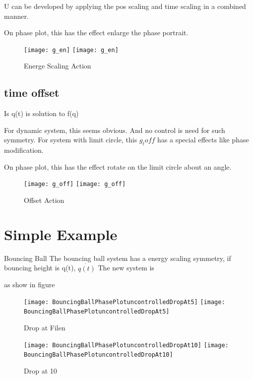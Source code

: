 U can be developed by applying the pos scaling and time scaling in a combined manner.

On phase plot, this has the effect enlarge the phase portrait.

\begin{figure}[!htbp]
  \begin{center}
    \leavevmode
    \ifpdf
      \texttt{[image: g\_en]}
    \else
      \texttt{[image: g\_en]}
    \fi
    \caption{Energe Scaling Action}
    \label{fig:gen}
\end{center}
\end{figure}
\subsection*{time offset}
Is q(t) is solution to f(q)

For dynamic system, this seems obvious. And no control is need for such symmetry.
For system with limit circle, this $g_toff$ has a special effects like phase modification.

On phase plot, this has the effect rotate on the limit circle about an angle.


\begin{figure}[!htbp]
  \begin{center}
    \leavevmode
    \ifpdf
      \texttt{[image: g\_off]}
    \else
      \texttt{[image: g\_off]}
    \fi
    \caption{Offset Action}
    \label{fig:goff}
\end{center}
\end{figure}





\section{Simple Example}
Bouncing Ball
The bouncing ball system has a energy scaling symmetry, if bouncing height is q(t), $\dot{q(t)}$
The new system is 

as show in figure

\begin{figure}[!htbp]
  \begin{center}
    \leavevmode
    \ifpdf
      \texttt{[image: BouncingBallPhasePlotuncontrolledDropAt5]}
    \else
      \texttt{[image: BouncingBallPhasePlotuncontrolledDropAt5]}
    \fi
    \caption{Drop at Filen}
    \label{fig:bouncing5}
\end{center}
\end{figure}


\begin{figure}[!htbp]
  \begin{center}
    \leavevmode
    \ifpdf
      \texttt{[image: BouncingBallPhasePlotuncontrolledDropAt10]}
    \else
      \texttt{[image: BouncingBallPhasePlotuncontrolledDropAt10]}
    \fi
    \caption{Drop at 10}
    \label{fig:bouncing5}
\end{center}
\end{figure}

